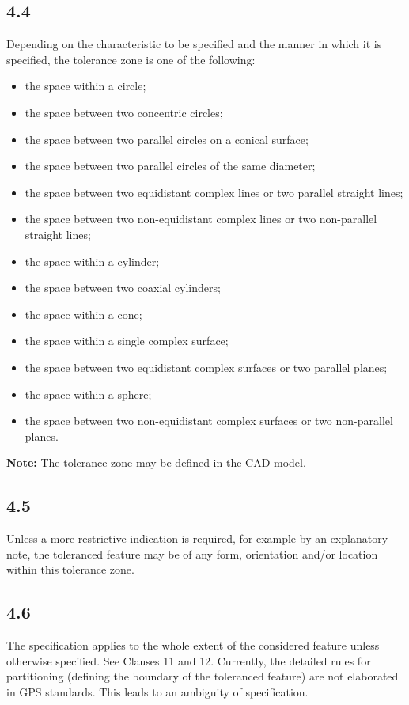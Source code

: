 \documentclass[a4paper,12pt]{article}
\begin{document}
\subsection*{4.4}
Depending on the characteristic to be specified and the manner in which it is specified, the tolerance zone is one of the following:

\begin{itemize}[label=--]
    \item the space within a circle;
    \item the space between two concentric circles;
    \item the space between two parallel circles on a conical surface;
    \item the space between two parallel circles of the same diameter;
    \item the space between two equidistant complex lines or two parallel straight lines;
    \item the space between two non-equidistant complex lines or two non-parallel straight lines;
    \item the space within a cylinder;
    \item the space between two coaxial cylinders;
    \item the space within a cone;
    \item the space within a single complex surface;
    \item the space between two equidistant complex surfaces or two parallel planes;
    \item the space within a sphere;
    \item the space between two non-equidistant complex surfaces or two non-parallel planes.
\end{itemize}

\textbf{Note:} The tolerance zone may be defined in the CAD model.

\subsection*{4.5}
Unless a more restrictive indication is required, for example by an explanatory note, the toleranced feature may be of any form, orientation and/or location within this tolerance zone.

\subsection*{4.6}
The specification applies to the whole extent of the considered feature unless otherwise specified. See Clauses 11 and 12. Currently, the detailed rules for partitioning (defining the boundary of the toleranced feature) are not elaborated in GPS standards. This leads to an ambiguity of specification.
\end{document}
